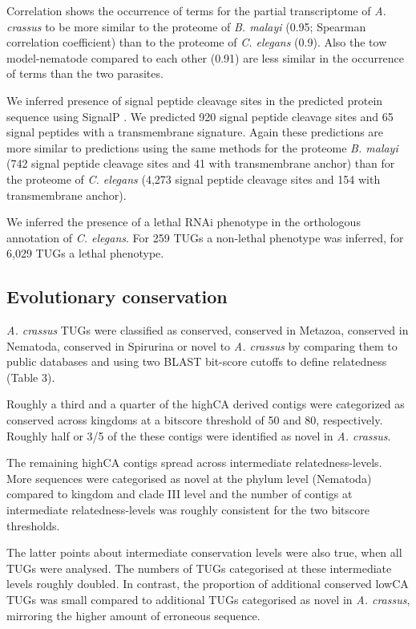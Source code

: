 \documentclass[10pt]{bmc_article}
\newenvironment{bmcformat}{\begin{raggedright}\baselineskip20pt\sloppy\setboolean{publ}{false}}{\end{raggedright}\baselineskip20pt\sloppy}
\begin{document}
\begin{bmcformat}
Correlation shows the occurrence of terms for the partial
transcriptome of \textit{A. crassus} to be more similar to the
proteome of \textit{B. malayi} (0.95;
Spearman correlation coefficient) than to the proteome of
\textit{C. elegans} (0.9). Also the tow
model-nematode compared to each other (0.91)
are less similar in the occurrence of terms than the two parasites.

We inferred presence of signal peptide cleavage sites in the predicted
protein sequence using SignalP \cite{pmid21959131}. We predicted
920 signal peptide cleavage sites and
65 signal peptides with a transmembrane
signature. Again these predictions are more similar to predictions
using the same methods for the proteome \textit{B. malayi}
(742 signal peptide cleavage sites and
41 with transmembrane anchor) than for the
proteome of \textit{C. elegans} (4,273 signal peptide
cleavage sites and 154 with transmembrane anchor).

We inferred the presence of a lethal RNAi phenotype in the orthologous
annotation of \textit{C. elegans}. For
259 TUGs a non-lethal phenotype was
inferred, for 6,029 TUGs a lethal phenotype.

\subsection*{Evolutionary conservation}

\textit{A. crassus} TUGs were classified as conserved, conserved in
Metazoa, conserved in Nematoda, conserved in Spirurina or novel to
\textit{A. crassus} by comparing them to public databases and using
two BLAST bit-score cutoffs to define relatedness (Table 3).

Roughly a third and a quarter of the highCA derived contigs were
categorized as conserved across kingdoms at a bitscore threshold of 50
and 80, respectively. Roughly half or 3/5 of the these contigs were
identified as novel in \textit{A. crassus}.

The remaining highCA contigs spread across intermediate
relatedness-levels. More sequences were categorised as novel at the
phylum level (Nematoda) compared to kingdom and clade III level and the
number of contigs at intermediate relatedness-levels was roughly
consistent for the two bitscore thresholds.

The latter points about intermediate conservation levels were also
true, when all TUGs were analysed. The numbers of TUGs categorised at
these intermediate levels roughly doubled. In contrast, the proportion
of additional conserved lowCA TUGs was small compared to additional
TUGs categorised as novel in \textit{A. crassus}, mirroring the higher
amount of erroneous sequence.


\end{bmcformat}
\end{document}
